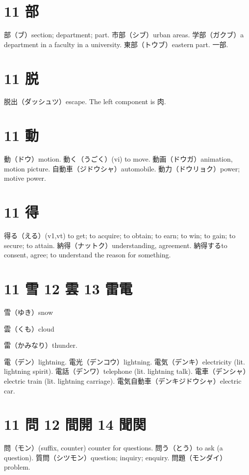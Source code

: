 \section{11 部}

部（ブ）section; department; part.
市部（シブ）urban areas.
学部（ガクブ）a department in a faculty in a university.
東部（トウブ）eastern part.
一部.

\section{11 脱}

脱出（ダッシュツ）escape.
The left component is 肉.

\section{11 動}

動（ドウ）motion.
動く（うごく）(vi) to move.
動画（ドウガ）animation, motion picture.
自動車（ジドウシャ）automobile.
動力（ドウリョク）power; motive power.

\section{11 得}

得る（える）(v1,vt) to get; to acquire; to obtain; to earn; to win; to gain; to secure; to attain.
納得（ナットク）understanding, agreement.
納得するto consent, agree; to understand the reason for something.

\section{11 雪 12 雲 13 雷電}

雪（ゆき）snow

雲（くも）cloud

雷（かみなり）thunder.

電（デン）lightning.
電光（デンコウ）lightning.
電気（デンキ）electricity (lit. lightning spirit).
電話（デンワ）telephone (lit. lightning talk).
電車（デンシャ）electric train (lit. lightning carriage).
電気自動車（デンキジドウシャ）electric car.

\section{11 問 12 間開 14 聞関}

問（モン）(suffix, counter) counter for questions.
問う（とう）to ask (a question).
質問（シツモン）question; inquiry; enquiry.
問題（モンダイ）problem.

